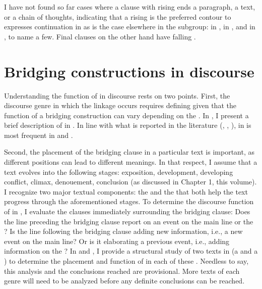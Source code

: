 \documentclass[output=paper]{LSP/langsci}
\begin{document}
I have not found so far cases where a clause with rising  ends a paragraph, a text, or a chain of thoughts, indicating that a rising  is the preferred contour to expresses continuation in  as is the case elsewhere in the  subgroup: in  \citep[][521]{Lichtenberk83}, in  \citep[][63]{Schokkin13}, and in  \citep[][38]{Schneider10}, to name a few. Final clauses on the other hand have falling . 

\section{Bridging constructions in discourse} 
\label{Gusec:Understanding}
Understanding the function of  in discourse rests on two points. First, the discourse genre in which the linkage occurs requires defining given that the function of a bridging construction can vary depending on the  \citep{devries.2005}. In , I present a brief description of  in . In line with what is reported in the literature (\citealt[][9]{longacre83},  \citealt[][365]{devries.2005}, \citealt[][274]{Thompson.et.al.2007}),  in  is most frequent in  and .   

Second, the placement of the bridging clause in a particular text is important, as different positions can lead to different meanings. In that respect, I assume that a text evolves into the following stages: exposition, development, developing conflict, climax, denouement, conclusion (as discussed in Chapter 1, this volume). I recognize two major textual components: the  and the  \citep[][14--17]{longacre83} that both help the text progress through the aforementioned stages. To determine the discourse function of  in , I evaluate the clauses immediately surrounding the bridging clause: Does the line preceding the bridging clause report on an event on the main line or the ? Is the line following the bridging clause adding new information, i.e., a new event on the main line? Or is it elaborating a previous event, i.e., adding information on the ? In  and , I provide a structural study of two texts in  (a  and a ) to determine the placement and function of  in each of these . Needless to say, this analysis and the conclusions reached are provisional. More texts of each genre will need to be analyzed before any definite conclusions can be reached.   
\end{document}
